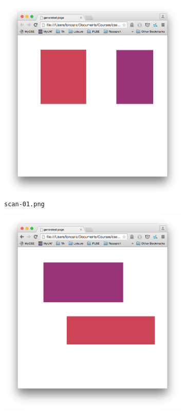 \documentclass{article}
\begin{document}
\begin{figure}[h]
\begin{center}
    \begin{subfigure}[b]{0.3\textwidth}
        \includegraphics[width=\textwidth]{scan-01-output.png}
        \caption{\texttt{scan-01.png}}
    \end{subfigure}
    \begin{subfigure}[b]{0.3\textwidth}
        \includegraphics[width=\textwidth]{scan-04-output.png}

\end{subfigure}
\end{center}
\end{figure}
\end{document}
